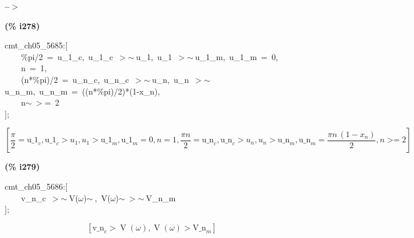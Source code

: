 \documentclass[fleqn]{article}
\begin{document}
\noindent
\begin{minipage}[t]{4.000000em}\color{red}\bfseries
 --\ensuremath{\ensuremath{>}}	
\end{minipage}
\begin{minipage}[t]{\textwidth}\color{blue}

\end{minipage}

\noindent%



\noindent
\begin{minipage}[t]{4.000000em}\color{red}\bfseries
(\% i278)	
\end{minipage}
\begin{minipage}[t]{\textwidth}\color{blue}
cmt\_ch05\_5685:[\\
\ \ \ \ \%pi/2\ =\ u\_1\_c,\ u\_1\_c\ \ensuremath{>}\ensuremath{\sim\ }u\_1,\ u\_1\ \ensuremath{>}\ensuremath{\sim\ }u\_1\_m,\ u\_1\_m\ =\ 0,\\
\ \ \ \ n\ =\ 1,\\
\ \ \ \ (n*\%pi)/2\ =\ u\_n\_c,\ u\_n\_c\ \ensuremath{>}\ensuremath{\sim\ }u\_n,\ u\_n\ \ensuremath{>}\ensuremath{\sim\ }u\_n\_m,\ u\_n\_m\ =\ ((n*\%pi)/2)*(1-x\_n),\\
\ \ \ \ n\ensuremath{\sim\ }\ensuremath{>}=\ 2\\
];
\end{minipage}
\[\displaystyle \tag{\% o278} 
\operatorname{[}\frac{\ensuremath{\pi} }{2}={{\ensuremath{\mathrm{u\_ 1}}}_c}\operatorname{,}{{\ensuremath{\mathrm{u\_ 1}}}_c}\operatorname{>  }{u_1}\operatorname{,}{u_1}\operatorname{>  }{{\ensuremath{\mathrm{u\_ 1}}}_m}\operatorname{,}{{\ensuremath{\mathrm{u\_ 1}}}_m}=0\operatorname{,}n=1\operatorname{,}\frac{\ensuremath{\pi}  n}{2}={{\ensuremath{\mathrm{u\_ n}}}_c}\operatorname{,}{{\ensuremath{\mathrm{u\_ n}}}_c}\operatorname{>  }{u_n}\operatorname{,}{u_n}\operatorname{>  }{{\ensuremath{\mathrm{u\_ n}}}_m}\operatorname{,}{{\ensuremath{\mathrm{u\_ n}}}_m}=
\frac{\ensuremath{\pi}  n\, \left( 1-{x_n}\right) }{2}\operatorname{,}n\operatorname{>  =}2\operatorname{]}\mbox{}
\]


\noindent
\begin{minipage}[t]{4.000000em}\color{red}\bfseries
(\% i279)	
\end{minipage}
\begin{minipage}[t]{\textwidth}\color{blue}
cmt\_ch05\_5686:[\\
\ \ \ \ v\_n\_c\ \ensuremath{>}\ensuremath{\sim\ }V(\ensuremath{\omega})\ensuremath{\sim\ },\ V(\ensuremath{\omega})\ensuremath{\sim\ }\ensuremath{>}\ensuremath{\sim\ }V\_n\_m\\
];
\end{minipage}
\[\displaystyle \tag{\% o279} 
\left[ {{\ensuremath{\mathrm{v\_ n}}}_c}\operatorname{>  }\operatorname{V}\left( \omega \right) \operatorname{,}\operatorname{V}\left( \omega \right) \operatorname{>  }{{\ensuremath{\mathrm{V\_ n}}}_m}\right] \mbox{}
\]
\end{document}
